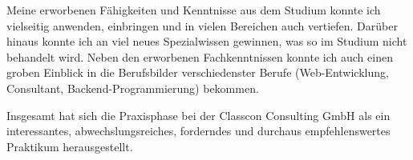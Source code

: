 \documentclass{whswinvcbook}
\begin{document}
Meine erworbenen Fähigkeiten und Kenntnisse aus dem Studium konnte ich vielseitig anwenden, einbringen und in vielen Bereichen auch vertiefen. Darüber hinaus konnte ich an viel neues Spezialwissen gewinnen, was so im Studium nicht behandelt wird. Neben den erworbenen Fachkenntnissen konnte ich auch einen groben Einblick in die Berufsbilder verschiedenster Berufe (Web-Entwicklung, Consultant, Backend-Programmierung) bekommen.

Insgesamt hat sich die Praxisphase bei der Classcon Consulting GmbH als ein interessantes, abwechslungsreiches, forderndes und durchaus empfehlenswertes Praktikum herausgestellt.

\backmatter

\preparebibliography

\end{document}
